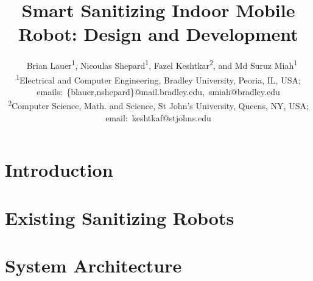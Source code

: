 \documentclass[letterpaper]{article} %
\title{Smart Sanitizing Indoor Mobile Robot: Design and Development}
\author{~%
Brian Lauer\textsuperscript{\rm 1}, Nicoulas Shepard\textsuperscript{\rm 1},
Fazel Keshtkar\textsuperscript{\rm 2}, and Md Suruz Miah\textsuperscript{\rm 1}
\\  
\textsuperscript{\rm 1}Electrical and Computer Engineering, Bradley University, Peoria, IL, USA; emails:~\{blauer,nshepard\}@mail.bradley.edu,~smiah@bradley.edu\\
\textsuperscript{\rm 2}Computer Science, Math. and Science, St John's University, Queens, NY, USA; email:~keshtkaf@stjohns.edu
}
\begin{document}
\maketitle

\begin{abstract}
\end{abstract}

\section{Introduction}
\label{sec:introduction}

\section{Existing Sanitizing Robots} 
\label{sec:Literature}




\section{System Architecture}
\label{sec:SystemArchitecture}

\end{document}
